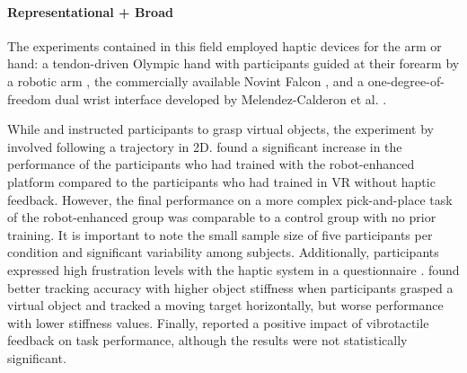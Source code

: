 \paragraph{Representational + Broad} \label{sec:representationalbroad}
The experiments contained in this field employed haptic devices for the arm or hand: a tendon-driven Olympic hand with participants guided at their forearm by a robotic arm \cite{Chappell2022}, the commercially available Novint Falcon \cite{Gambaro2014}, and a one-degree-of-freedom dual wrist interface \cite{Perez2023} developed by Melendez-Calderon et al. \cite{Melendez-Calderon2011Hi5:Control}.

While \cite{Chappell2022} and \cite{Perez2023} instructed participants to grasp virtual objects, the experiment by \cite{Gambaro2014} involved following a trajectory in 2D. 
\cite{Chappell2022} found a significant increase in the performance of the participants who had trained with the robot-enhanced platform compared to the participants who had trained in VR without haptic feedback. However, the final performance on a more complex pick-and-place task of the robot-enhanced group was comparable to a control group with no prior training. It is important to note the small sample size of five participants per condition and significant variability among subjects. Additionally, participants expressed high frustration levels with the haptic system in a questionnaire \cite{Chappell2022}.
\cite{Perez2023} found better tracking accuracy with higher object stiffness when participants grasped a virtual object and tracked a moving target horizontally, but worse performance with lower stiffness values.
Finally, \cite{Gambaro2014} reported a positive impact of vibrotactile feedback on task performance, although the results were not statistically significant. 

